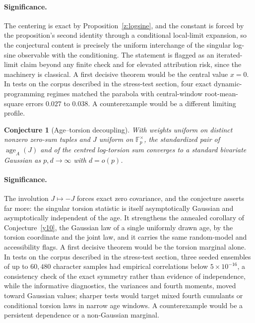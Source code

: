 \documentclass[11pt]{article}
\newtheorem{conjecture}{Conjecture}
\theoremstyle{definition}
\begin{document}
\paragraph{Significance.}
The centering is exact by Proposition~\ref{z:logsine}, and the constant is forced by the proposition's second identity through a conditional local-limit expansion, so the conjectural content is precisely the uniform interchange of the singular log-sine observable with the conditioning.  The statement is flagged as an iterated-limit claim beyond any finite check and for elevated attribution risk, since the machinery is classical.  A first decisive theorem would be the central value $x=0$.  In tests on the corpus described in the stress-test section, four exact dynamic-programming regimes matched the parabola with central-window root-mean-square errors $0.027$ to $0.038$.  A counterexample would be a different limiting profile.

\begin{conjecture}[Age--torsion decoupling]\label{z14}
With weights uniform on distinct nonzero zero-sum tuples and $J$ uniform on $\mathbb F_p^\times$, the standardized pair of $\operatorname{age}_A(J)$ and of the centred log-torsion sum converges to a standard bivariate Gaussian as $p,d\to\infty$ with $d=o(p)$.
\end{conjecture}

\paragraph{Significance.}
The involution $J\mapsto-J$ forces exact zero covariance, and the conjecture asserts far more: the singular torsion statistic is itself asymptotically Gaussian and asymptotically independent of the age.  It strengthens the annealed corollary of Conjecture~\ref{y10}, the Gaussian law of a single uniformly drawn age, by the torsion coordinate and the joint law, and it carries the same random-model and accessibility flags.  A first decisive theorem would be the torsion marginal alone.  In tests on the corpus described in the stress-test section, three seeded ensembles of up to $60{,}480$ character samples had empirical correlations below $5\times10^{-16}$, a consistency check of the exact symmetry rather than evidence of independence, while the informative diagnostics, the variances and fourth moments, moved toward Gaussian values; sharper tests would target mixed fourth cumulants or conditional torsion laws in narrow age windows.  A counterexample would be a persistent dependence or a non-Gaussian marginal.
\end{document}
